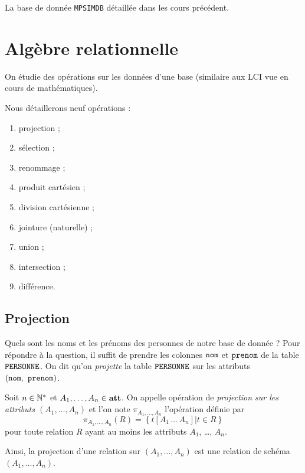 \begin{exemple}
  La base de donnée \texttt{MPSIMDB} détaillée dans les cours précédent.
\end{exemple}

\section{Algèbre relationnelle}

On étudie des opérations sur les données d'une base (similaire aux LCI vue en cours de mathématiques).

Nous détaillerons neuf opérations :
\begin{enumerate}
\item projection ;
\item sélection ;
\item renommage ;
\item produit cartésien ;
\item division cartésienne ; 
\item jointure (naturelle) ;
\item union ;
\item intersection ;
\item différence.
\end{enumerate}

\subsection{Projection}

Quels sont les noms et les prénoms des personnes de notre base de donnée ? Pour répondre à la question, il suffit de prendre les colonnes
$\mathtt{nom}$ et $\mathtt{prenom}$ de la table $\mathtt{PERSONNE}{}$. On dit qu'on \emph{projette} la
table $\mathtt{PERSONNE}$ sur les attributs $(\mathtt{nom},\ \mathtt{prenom})$.

\begin{defi}[Projection]
  Soit $n\in \mathbb{N}^{*}$ et $A_{1}, \ldots{}, A_{n}\in
  \mathbf{att}$. On appelle opération de \emph{projection sur les attributs
    $(A_{1}, \ldots, A_{n})$}
  et l'on note $\pi_{A_{1},\ldots,A_{n}}$ l'opération définie par
  \begin{equation*}
    \pi_{A_{1},\ldots,A_{n}}(R) = \left\{t[A_{1}\,\ldots\,A_{n}] | t \in R \right\}
  \end{equation*}
  pour toute relation $R$ ayant au moins les attributs $A_{1}$,
  \ldots{}, $A_{n}$.
  
  Ainsi, la projection d'une relation sur $(A_{1}, \ldots{}, A_{n})$ est une relation de schéma $(A_1,\dots,A_n)$.
\end{defi}

